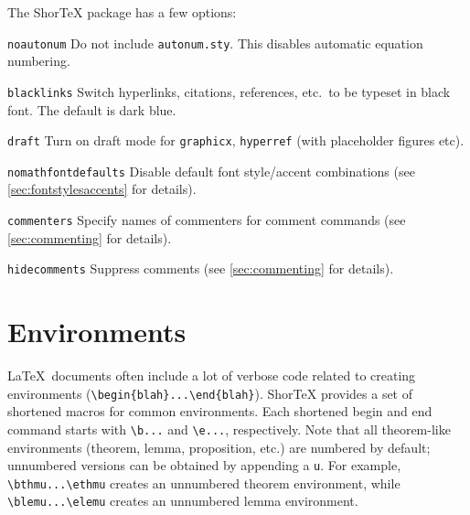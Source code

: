 \documentclass{article}
\begin{document}
The ShorTeX package has a few options:
\bdesc
\item[\texttt{noautonum}] Do not include \texttt{autonum.sty}. This disables automatic equation numbering.
\item[\texttt{blacklinks}] Switch hyperlinks, citations, references, etc.~to be typeset in black font. The default is dark blue.
\item[\texttt{draft}] Turn on draft mode for \texttt{graphicx}, \texttt{hyperref} (with placeholder figures etc).
\item[\texttt{nomathfontdefaults}] Disable default font style/accent combinations (see \cref{sec:fontstylesaccents} for details).
\item[\texttt{commenters}] Specify names of commenters for comment commands (see \cref{sec:commenting} for details).
\item[\texttt{hidecomments}] Suppress comments (see \cref{sec:commenting} for details).
\edesc

\newpage

\section{Environments}

\LaTeX~documents often include a lot of verbose code
related to creating environments (\verb!\begin{blah}...\end{blah}!). ShorTeX provides a set of 
shortened macros for common environments.
Each shortened begin and end command starts with \verb!\b...! and \verb!\e...!, respectively.
Note that all theorem-like environments (theorem, lemma, proposition, etc.) 
are numbered by default; unnumbered versions can be obtained by appending a \verb!u!. For example,
\verb!\bthmu...\ethmu! creates an unnumbered theorem environment, while
\verb!\blemu...\elemu! creates an unnumbered lemma environment.
\end{document}
